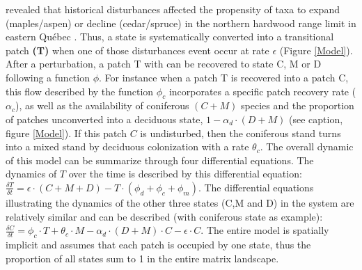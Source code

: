 revealed that historical disturbances affected the propensity of taxa to
expand (maples/aspen) or decline (cedar/spruce) in the northern hardwood range
limit in eastern Québec \cite{Dupuis2011}. Thus, a state is systematically
converted into a transitional patch \textbf{(T)} when one of those
disturbances event occur at rate $\epsilon$ (Figure \ref{Model}). After a
perturbation, a patch T with can be recovered to state C, M or D following a
function $\phi$. For instance when a patch T is recovered into a patch C, this
flow described by the function $\phi_c$ incorporates a specific patch recovery
rate ($\alpha_c$), as well as the availability of coniferous $(C + M)$ species
and the proportion of patches unconverted into a deciduous state, $1- \alpha_d
\cdot (D + M)$ (see caption, figure \ref{Model}). If this patch $C$ is
undisturbed, then the coniferous stand turns into a mixed stand by deciduous
colonization with a rate $\theta_c$. The  overall dynamic of this model can be
summarize through four differential equations. The dynamics of $T$ over the
time is described by this differential equation: $\frac{\delta T}{\delta t} =
\epsilon \cdot (C+M+D) - T \cdot (\phi_d + \phi_c + \phi_m)$. The differential
equations illustrating the dynamics of the other three states (C,M and D) in
the system are relatively similar and can be described (with coniferous state
as example): $\frac{\delta C}{\delta t} = \phi_c \cdot T + \theta_c \cdot M -
\alpha_d \cdot (D+M)\cdot C - \epsilon \cdot C$. The entire model is spatially
implicit and assumes that each patch is occupied by one state, thus the
proportion of all states sum to 1 in the entire matrix landscape. \\


